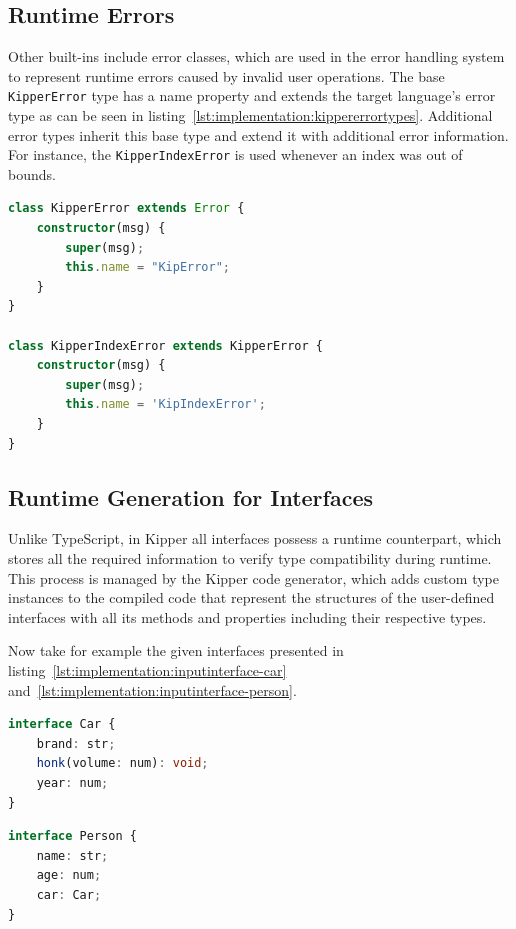 \subsection{Runtime Errors}

Other built-ins include error classes, which are used in the error handling system to represent runtime errors caused by invalid user operations. The base \lstinline|KipperError| type has a name property and extends the target language's error type as can be seen in listing~\ref{lst:implementation:kippererrortypes}. Additional error types inherit this base type and extend it with additional error information. For instance, the  \lstinline|KipperIndexError| is used whenever an index was out of bounds.

\begin{lstlisting}[language=Typescript,caption=Kipper error types,label=lst:implementation:kippererrortypes]
class KipperError extends Error {
	constructor(msg) {
		super(msg);
		this.name = "KipError";
	}
}

class KipperIndexError extends KipperError {
	constructor(msg) { 
		super(msg); 
		this.name = 'KipIndexError'; 
	} 
}
\end{lstlisting}

\subsection{Runtime Generation for Interfaces}

Unlike TypeScript, in Kipper all interfaces possess a runtime counterpart, which stores all the required information to verify type compatibility during runtime. This process is managed by the Kipper code generator, which adds custom type instances to the compiled code that represent the structures of the user-defined interfaces with all its methods and properties including their respective types.

Now take for example the given interfaces presented in listing~\ref{lst:implementation:inputinterface-car} and~\ref{lst:implementation:inputinterface-person}.

\begin{lstlisting}[language=Typescript,caption=Example interface \lstinline|Car| in the Kipper language,label=lst:implementation:inputinterface-car]
interface Car {
	brand: str;
	honk(volume: num): void;
	year: num;
}
\end{lstlisting}

\begin{lstlisting}[language=Typescript,caption=Example interface \lstinline|Person| in the Kipper language including a reference to a different interface,label=lst:implementation:inputinterface-person]
interface Person {
	name: str;
	age: num;
	car: Car;
}
\end{lstlisting}

